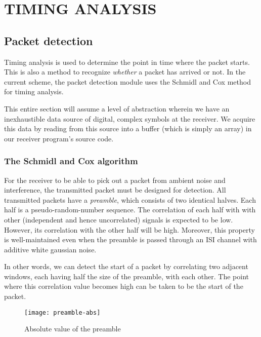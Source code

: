\chapter{TIMING ANALYSIS}
\label{chap:timing}


\section{Packet detection}

Timing analysis is used to determine the point in time where the packet starts.
This is also a method to recognize \emph{whether} a packet has arrived or not.
In the current scheme, the packet detection module uses the Schmidl and Cox %
method for timing analysis.

This entire section will assume a level of abstraction wherein we have an
inexhaustible data source of digital, complex symbols at the receiver. We
acquire this data by reading from this source into a buffer (which is simply an
array) in our receiver program's source code.

\subsection{The Schmidl and Cox algorithm}

For the receiver to be able to pick out a packet from ambient noise and
interference, the transmitted packet must be designed for detection. All
transmitted packets have a \emph{preamble}, which consists of two identical
halves. Each half is a pseudo-random-number sequence. The correlation of each
half with with other (independent and hence uncorrelated) signals is expected
to be low. However, its correlation with the other half will be high. Moreover,
this property is well-maintained even when the preamble is passed through an
ISI channel with additive white gaussian noise.

In other words, we can detect the start of a packet by correlating two adjacent
windows, each having half the size of the preamble, with each other. The point
where this correlation value becomes high can be taken to be the start of the
packet.

\begin{figure}[h]
	\centering
	\texttt{[image: preamble-abs]}
	\caption{Absolute value of the preamble}
	\label{fig:preamble-abs}
\end{figure}

